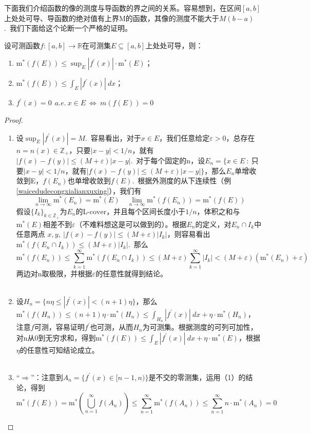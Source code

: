 \documentclass[color=green,thmcnt=section,lang=cn,12pt]{elegantbook}
\numberwithin{equation}{section}%
\numberwithin{figure}{section}%
\newcommand{\RR}{\mathbb{R}}
\newcommand{\ZZ}{\mathbb{Z}}
\newcommand{\ee}{\varepsilon}
\newcommand{\csf}[1]{\{#1_k\}_{k\in \ZZ_+}} %
\newcommand{\cu}[1]{\bigcup_{#1=1}^{\infty}} %
\newcommand{\cs}[1]{\sum_{#1=1}^{\infty}} %
\newcommand{\mx}[1]{\textrm{m}^*(#1)} %
\newcommand{\lcover}{\textrm{L-cover}} %
\begin{document}
下面我们介绍函数的像的测度与导函数的界之间的关系。容易想到，在区间$[a,b]$上处处可导、导函数的绝对值有上界M的函数，其像的测度不能大于$M(b-a)$.\ 
我们下面给这个论断一个严格的证明。
\begin{proposition}\label{mingti1}
    设可测函数$f:[a,b]\to\RR$在可测集$E\subseteq [a,b]$上处处可导，则：
    \begin{enumerate}[(1)]
        \item $\mx{f(E)}\leq \sup_E|f^{'}(x)|\cdot \mx{E}$；
        \item $\mx{f(E)}\leq \int_E|f^{'}(x)|\ dx$；
        \item $f^{'}(x)=0\ \ a.e.\ x\in E\ \Longleftrightarrow \ m(f(E))=0$
    \end{enumerate}
\end{proposition}
\begin{proof}
    \begin{enumerate}[(1)]
        \item 设$\sup_E|f^{'}(x)|=M$.\ 容易看出，对于$x\in E$，我们任意给定$\ee>0$，总存在$n=n(x)\in \ZZ_+$，只要$|x-y|<1/n$，就有$|f(x)-f(y)|\leq (M+\ee)|x-y|$.\ 
        对于每个固定的n，设$E_n=\{x\in E\ :\ $只要$|x-y|<1/n$，就有$|f(x)-f(y)|\leq (M+\ee)|x-y|\}$，那么$E_n$单增收敛到E，$f(E_n)$也单增收敛到$f(E)$.\ 
        根据外测度的从下连续性（例\ref{waicedudecongxialianxuxing}），我们有\begin{equation*}
            \lim_{n\to\infty}\mx{E_n}=\mx{E}\quad \lim_{n\to\infty}\mx{f(E_n)}=\mx{f(E)}
        \end{equation*}
        假设$\csf{I}$为$E_n$的$\lcover$，并且每个区间长度小于$1/n$，体积之和与$\mx{E}$相差不到$\ee$（不难料想这是可以做到的）。根据$E_n$的定义，对$E_n\cap I_k$中任意两点
        $x,y,\ |f(x)-f(y)|\leq (M+\ee)|I_k|$，则容易看出$\mx{f(E_n\cap I_k)}\leq (M+\ee)|I_k|$.\ 那么\begin{equation*}
            \mx{f(E_n)}\leq \cs{k}\mx{f(E_n\cap I_k)}\leq (M+\ee)\cs{k}|I_k|<(M+\ee)(\mx{E_n}+\ee)
        \end{equation*} 
        两边对n取极限，并根据$\ee$的任意性就得到结论。\\
        \ 
        \item 设$H_n=\{n\eta\leq |f^{'}(x)|< (n+1)\eta\}$，那么$\mx{f(H_n)}\leq (n+1)\eta\cdot \mx{H_n}\leq \int_{H_n}|f^{'}(x)|\ dx+\eta\cdot \mx{H_n}$，
        注意$f$可测，容易证明$f^{'}$也可测，从而$H_n$为可测集。根据测度的可列可加性，对n从0到无穷求和，得到$\mx{f(E)}\leq \int_E|f^{'}(x)|\ dx+\eta \cdot \mx{E}$，根据$\eta$的任意性可知结论成立。\\
        \ 
        \item ``$\Longrightarrow$''：注意到$A_n=\{f^{'}(x)\in[n-1,n)\}$是不交的零测集，运用（1）的结论，得到\begin{equation*}
            \mx{f(E)}=\mx{\cu{n}f(A_n)}\leq \cs{n}\mx{f(A_n)}\leq \cs{n}n\cdot \mx{A_n}=0
        \end{equation*}



\end{enumerate}
\end{proof}
\end{document}
